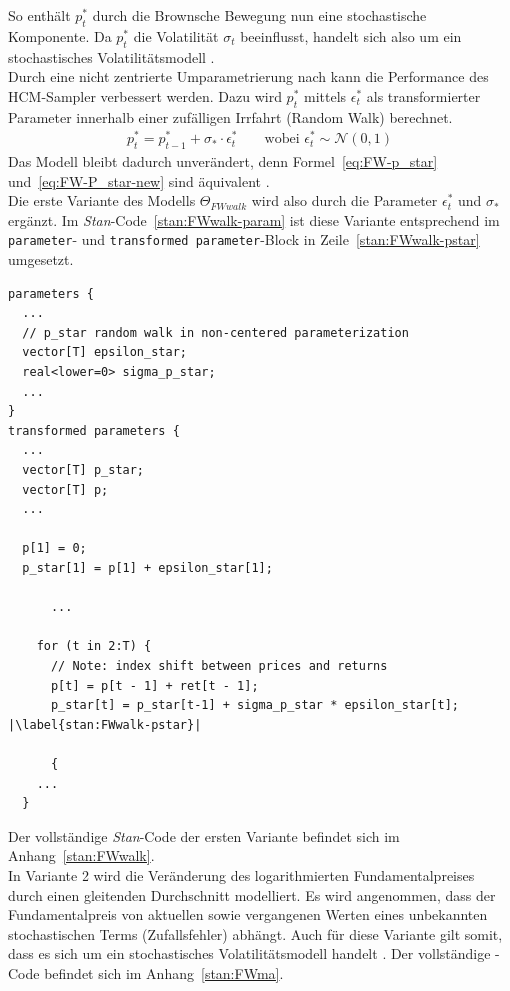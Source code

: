 \documentclass[ngerman]{ttlab-qualify}
\begin{document}
So enthält $p_t^*$ durch die Brownsche Bewegung nun eine stochastische Komponente. Da $p_t^*$ die Volatilität $\sigma_t$ beeinflusst, handelt sich also um ein stochastisches Volatilitätsmodell \parencite{bertschinger:2018, FW:2011}.\\ 

Durch eine nicht zentrierte Umparametrierung nach \parencite{bertschinger:2018} kann die Performance des HCM-Sampler verbessert werden. Dazu wird $p_t^*$ mittels $\epsilon_t^*$ als transformierter Parameter innerhalb einer zufälligen Irrfahrt (Random Walk) berechnet.
\begin{align}
\label{eq:FW-P_star-new}
p_t^* = p_{t-1}^*+\sigma_*\cdot\epsilon_t^* &&\text{ wobei }\epsilon_t^*\sim \mathcal{N}(0,1)
\end{align}
Das Modell bleibt dadurch unverändert, denn Formel~\ref{eq:FW-p_star} und~\ref{eq:FW-P_star-new} sind äquivalent \parencite{bertschinger:2018}.\\

Die erste Variante des Modells $\Theta_{FWwalk}$ wird also durch die Parameter $\epsilon_t^*$ und $\sigma_*$ ergänzt. Im \textit{Stan}-Code~\ref{stan:FWwalk-param} ist diese Variante entsprechend im \verb|parameter|- und \verb|transformed parameter|-Block in Zeile~\ref{stan:FWwalk-pstar} umgesetzt.

\begin{lstlisting}[style=custom, escapechar=|,caption={Teil-Modell(Random Walk) nach \parencite{bertschinger:2018, FW:2011}},label={stan:FWwalk-param}]
parameters {
  ...
  // p_star random walk in non-centered parameterization
  vector[T] epsilon_star;
  real<lower=0> sigma_p_star;
  ...
}
transformed parameters {
  ...
  vector[T] p_star;
  vector[T] p;
  ...

  p[1] = 0; 
  p_star[1] = p[1] + epsilon_star[1]; 

      ...

    for (t in 2:T) {
      // Note: index shift between prices and returns
      p[t] = p[t - 1] + ret[t - 1];
      p_star[t] = p_star[t-1] + sigma_p_star * epsilon_star[t]; |\label{stan:FWwalk-pstar}|     

      {
	...
  }
\end{lstlisting}

Der vollständige \textit{Stan}-Code der ersten Variante befindet sich im Anhang~\ref{stan:FWwalk}.\\

In Variante 2 wird die Veränderung des logarithmierten Fundamentalpreises durch einen gleitenden Durchschnitt modelliert. Es wird angenommen, dass der Fundamentalpreis von aktuellen sowie vergangenen Werten eines unbekannten stochastischen Terms (Zufallsfehler) abhängt. Auch für diese Variante gilt somit, dass es sich um ein stochastisches Volatilitätsmodell handelt \parencite{bertschinger:2018}. Der vollständige -Code befindet sich im Anhang~\ref{stan:FWma}.\\
\end{document}
